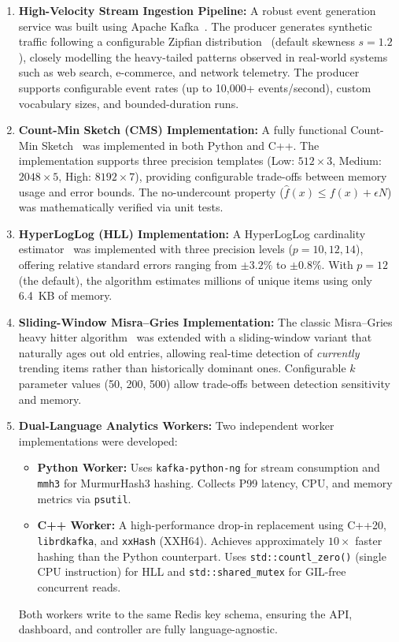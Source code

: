 \begin{enumerate}
    \item \textbf{High-Velocity Stream Ingestion Pipeline:}
    A robust event generation service was built using Apache Kafka~\cite{kafka}. The producer generates synthetic traffic following a configurable Zipfian distribution~\cite{zipf} (default skewness $s = 1.2$), closely modelling the heavy-tailed patterns observed in real-world systems such as web search, e-commerce, and network telemetry. The producer supports configurable event rates (up to 10,000+ events/second), custom vocabulary sizes, and bounded-duration runs.

    \item \textbf{Count-Min Sketch (CMS) Implementation:}
    A fully functional Count-Min Sketch~\cite{cms} was implemented in both Python and C++. The implementation supports three precision templates (Low: $512 \times 3$, Medium: $2048 \times 5$, High: $8192 \times 7$), providing configurable trade-offs between memory usage and error bounds. The no-undercount property ($\hat{f}(x) \le f(x) + \epsilon N$) was mathematically verified via unit tests.

    \item \textbf{HyperLogLog (HLL) Implementation:}
    A HyperLogLog cardinality estimator~\cite{hll} was implemented with three precision levels ($p = 10, 12, 14$), offering relative standard errors ranging from $\pm 3.2\%$ to $\pm 0.8\%$. With $p = 12$ (the default), the algorithm estimates millions of unique items using only 6.4~KB of memory.

    \item \textbf{Sliding-Window Misra--Gries Implementation:}
    The classic Misra--Gries heavy hitter algorithm~\cite{misra} was extended with a sliding-window variant that naturally ages out old entries, allowing real-time detection of \textit{currently} trending items rather than historically dominant ones. Configurable $k$ parameter values (50, 200, 500) allow trade-offs between detection sensitivity and memory.

    \item \textbf{Dual-Language Analytics Workers:}
    Two independent worker implementations were developed:
    \begin{itemize}
        \item \textbf{Python Worker:} Uses \texttt{kafka-python-ng} for stream consumption and \texttt{mmh3} for MurmurHash3 hashing. Collects P99 latency, CPU, and memory metrics via \texttt{psutil}.
        \item \textbf{C++ Worker:} A high-performance drop-in replacement using C++20, \texttt{librdkafka}, and \texttt{xxHash} (XXH64). Achieves approximately $10\times$ faster hashing than the Python counterpart. Uses \texttt{std::countl\_zero()} (single CPU instruction) for HLL and \texttt{std::shared\_mutex} for GIL-free concurrent reads.
    \end{itemize}
    Both workers write to the same Redis key schema, ensuring the API, dashboard, and controller are fully language-agnostic.


\end{enumerate}
